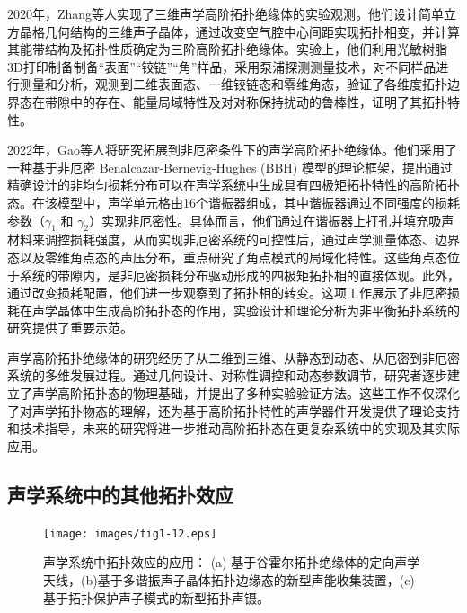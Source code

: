 2020年，Zhang等人实现了三维声学高阶拓扑绝缘体的实验观测\cite{i7}。他们设计简单立方晶格几何结构的三维声子晶体，通过改变空气腔中心间距实现拓扑相变，并计算其能带结构及拓扑性质确定为三阶高阶拓扑绝缘体。实验上，他们利用光敏树脂3D打印制备制备“表面”“铰链”“角”样品，采用泵浦探测测量技术，对不同样品进行测量和分析，观测到二维表面态、一维铰链态和零维角态，验证了各维度拓扑边界态在带隙中的存在、能量局域特性及对对称保持扰动的鲁棒性，证明了其拓扑特性。

2022年，Gao等人将研究拓展到非厄密条件下的声学高阶拓扑绝缘体\cite{i8}。他们采用了一种基于非厄密 Benalcazar-Bernevig-Hughes (BBH) 模型的理论框架，提出通过精确设计的非均匀损耗分布可以在声学系统中生成具有四极矩拓扑特性的高阶拓扑态。在该模型中，声学单元格由16个谐振器组成，其中谐振器通过不同强度的损耗参数（\(\gamma_1\) 和 \(\gamma_2\)）实现非厄密性。具体而言，他们通过在谐振器上打孔并填充吸声材料来调控损耗强度，从而实现非厄密系统的可控性后，通过声学测量体态、边界态以及零维角点态的声压分布，重点研究了角点模式的局域化特性。这些角点态位于系统的带隙内，是非厄密损耗分布驱动形成的四极矩拓扑相的直接体现。此外，通过改变损耗配置，他们进一步观察到了拓扑相的转变。这项工作展示了非厄密损耗在声学晶体中生成高阶拓扑态的作用，实验设计和理论分析为非平衡拓扑系统的研究提供了重要示范。

声学高阶拓扑绝缘体的研究经历了从二维到三维、从静态到动态、从厄密到非厄密系统的多维发展过程。通过几何设计、对称性调控和动态参数调节，研究者逐步建立了声学高阶拓扑态的物理基础，并提出了多种实验验证方法。这些工作不仅深化了对声学拓扑物态的理解，还为基于高阶拓扑特性的声学器件开发提供了理论支持和技术指导，未来的研究将进一步推动高阶拓扑态在更复杂系统中的实现及其实际应用。

\subsection{声学系统中的其他拓扑效应}

\begin{figure}[h!]
    \centering
    \texttt{[image: images/fig1-12.eps]} 
    \caption{声学系统中拓扑效应的应用：
    (a) 基于谷霍尔拓扑绝缘体的定向声学天线\cite{j2}，(b)基于多谐振声子晶体拓扑边缘态的新型声能收集装置\cite{j17}，(c)基于拓扑保护声子模式的新型拓扑声镊\cite{j13}。
    }
    \label{fig_1_12}
\end{figure}

